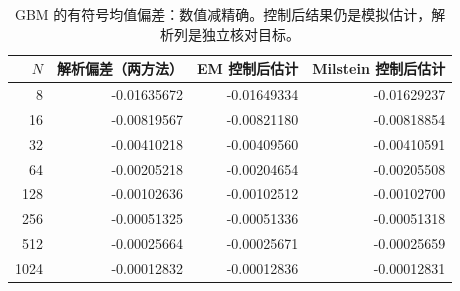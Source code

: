 \begin{table}[htbp]\centering\small
\caption{GBM 的有符号均值偏差：数值减精确。控制后结果仍是模拟估计，解析列是独立核对目标。}\label{tab:results-gbm-weak}
\begin{tabular}{rrrr}\toprule
$N$ & 解析偏差（两方法） & EM 控制后估计 & Milstein 控制后估计\\\midrule
8 & -0.01635672 & -0.01649334 & -0.01629237\\
16 & -0.00819567 & -0.00821180 & -0.00818854\\
32 & -0.00410218 & -0.00409560 & -0.00410591\\
64 & -0.00205218 & -0.00204654 & -0.00205508\\
128 & -0.00102636 & -0.00102512 & -0.00102700\\
256 & -0.00051325 & -0.00051336 & -0.00051318\\
512 & -0.00025664 & -0.00025671 & -0.00025659\\
1024 & -0.00012832 & -0.00012836 & -0.00012831\\
\bottomrule
\end{tabular}
\end{table}
